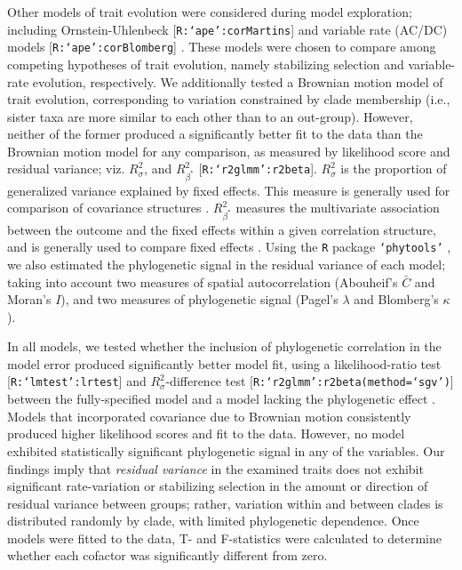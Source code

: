 \documentclass[twocolumn, linenumbers, superscriptaddress, nofootinbib]{revtex4-1}
\begin{document}
				Other models of trait evolution were considered during model exploration; including Ornstein-Uhlenbeck [\texttt{R:`ape':corMartins}] and variable rate (AC/DC) models [\texttt{R:`ape':corBlomberg}] \cite{Munkemuller2012, Ape}.
				These models were chosen to compare among competing hypotheses of trait evolution, namely stabilizing selection and variable-rate evolution, respectively.
				We additionally tested a Brownian motion model of trait evolution, corresponding to variation constrained by clade membership (i.e., sister taxa are more similar to each other than to an out-group).
				However, neither of the former produced a significantly better fit to the data than the Brownian motion model for any comparison, as measured by likelihood score and residual variance; viz. $R^2_{\sigma}$, and $R^2_{\beta^*}$ [\texttt{R:`r2glmm':r2beta}].
				$R^{2}_{\sigma}$ is the proportion of generalized variance explained by fixed effects.
				This measure is generally used for comparison of covariance structures \cite{Nakagawa2013, Jaeger2016, R2glmm}.
				$R^2_{\beta^*}$ measures the multivariate association between the outcome and the fixed effects within a given correlation structure, and is generally used to compare fixed effects \cite{Nakagawa2013, Jaeger2016, R2glmm}.
				Using the \texttt{R} package \texttt{`phytools'} \cite{Munkemuller2012, Phytools}, we also estimated the phylogenetic signal in the residual variance of each model; taking into account two measures of spatial autocorrelation (Abouheif's $\bar{C}$ and Moran's $I$), and two measures of phylogenetic signal (Pagel's $\lambda$ and Blomberg's $\kappa$).
				
				In all models, we tested whether the inclusion of phylogenetic correlation in the model error produced significantly better model fit, using a likelihood-ratio test [\texttt{R:`lmtest':lrtest}] and $R^{2}_{\sigma}$-difference test [\texttt{R:`r2glmm':r2beta(method=`sgv')}] between the fully-specified model and a model lacking the phylogenetic effect \cite{Lmtest, R2glmm}.
				Models that incorporated covariance due to Brownian motion consistently produced higher likelihood scores and fit to the data.
				However, no model exhibited statistically significant phylogenetic signal in any of the variables.
				Our findings imply that \emph{residual variance} in the examined traits does not exhibit significant rate-variation or stabilizing selection in the amount or direction of residual variance between groups; rather, variation within and between clades is distributed randomly by clade, with limited phylogenetic dependence.
				Once models were fitted to the data, T- and F-statistics were calculated to determine whether each cofactor was significantly different from zero.
				
\end{document}
